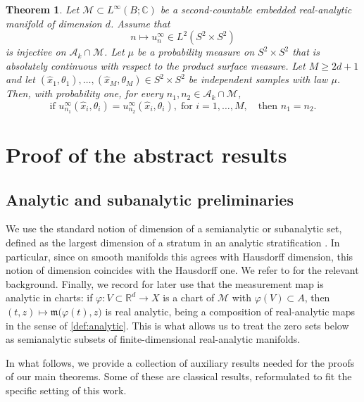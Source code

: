 \documentclass[11pt,oneside]{amsart}
\theoremstyle{plain}
\newtheorem{theorem}{Theorem}[section]
\newtheorem{lemma}[theorem]{Lemma}
\theoremstyle{definition}
\theoremstyle{remark}
\newcommand{\RR}{\mathbb{R}}
\newcommand{\CC}{\mathbb{C}}
\newcommand{\KK}{\mathbb{K}}
\newcommand{\calM}{\mathcal{M}}
\begin{document}
\begin{theorem}\label{thm:scattering}
Let $\calM\subset L^\infty(B;\CC)$ be a second-countable embedded real-analytic manifold of dimension $d$. Assume that
\[
    n\longmapsto u_{n}^\infty\in L^2(S^2\times S^2)
\]
is injective on $\mathcal A_k\cap\calM$. Let $\mu$ be a probability measure on $S^2\times S^2$ that is absolutely continuous with respect to the product surface measure. Let $M\geq2d+1$ and let $(\widehat x_1,\theta_1),\dots,(\widehat x_M,\theta_M)\in S^2\times S^2$ be independent samples with law $\mu$. Then, with probability one, for every $n_1,n_2\in\mathcal A_k\cap\calM$,
\[ \text{if }
    u_{n_1}^\infty(\widehat x_i,\theta_i)=u_{n_2}^\infty(\widehat x_i,\theta_i), \; \text{for } i=1,\dots,M, \quad \text{then } n_1=n_2.
\]
\end{theorem}


\section{Proof of the abstract results}\label{sec:proof-main}

\subsection{Analytic and subanalytic preliminaries}
We use the standard notion of dimension of a semianalytic or subanalytic set, defined as the largest dimension of a stratum in an analytic stratification \cite[Remark 2.12]{bierstone1988semianalytic}. In particular, since on smooth manifolds this agrees with Hausdorff dimension, this notion of dimension coincides with the Hausdorff one. We refer to \cite{bierstone1988semianalytic,narasimhan1985analysis} for the relevant background. Finally, we record for later use that the measurement map is analytic in charts: if $\varphi\colon V\subset\RR^d\to X$ is a chart of $\calM$ with $\varphi(V)\subset A$, then $(t,z)\mapsto\mathfrak m\bigl(\varphi(t),z\bigr)$ is real analytic, being a composition of real-analytic maps in the sense of \cref{def:analytic}. This is what allows us to treat the zero sets below as semianalytic subsets of finite-dimensional real-analytic manifolds.

In what follows, we provide a collection of auxiliary results needed for the proofs of our main theorems. Some of these are classical results, reformulated to fit the specific setting of this work.

\end{document}
